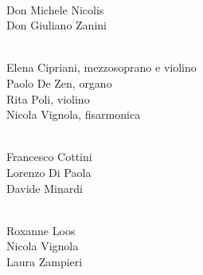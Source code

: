 \documentclass[10pt,b6paper,usenames,twoside]{article}
\newcommand\blankpage{%
    \null
    \thispagestyle{empty}%
    \addtocounter{page}{-1}%
    \newpage}
\begin{document}
\afterpage{\blankpage}


\thispagestyle{empty}%
    \addtocounter{page}{-1}%
    \newpage

\vspace*{10mm}
\begin{center}
\textcolor{forestgreen(traditional)}{\hspace*{-5mm} }\\
\vspace*{3mm}
\normalsize{Don Michele Nicolis\\
Don Giuliano Zanini}

\vspace*{15mm}

\textcolor{forestgreen(traditional)}{\hspace*{-5mm} }\\
\vspace*{3mm}
\normalsize{Elena Cipriani, mezzosoprano e violino\\
Paolo De Zen, organo\\
Rita Poli, violino\\
Nicola Vignola, fisarmonica}
	
\vspace*{15mm}

\vspace*{0mm}
\normalsize{
\begin{minipage}[t]{0.48\textwidth}
\begin{flushleft}
\textcolor{forestgreen(traditional)}{\hspace*{-0mm}}\\
\vspace*{3mm}
Francesco Cottini\\
Lorenzo Di Paola\\
Davide Minardi
\end{flushleft}
\end{minipage}
\hfill
\begin{minipage}[t]{0.48\textwidth}
\begin{flushright}
\textcolor{forestgreen(traditional)}{\hspace*{-5mm}}\\
\vspace*{3mm}
Roxanne Loos\\
Nicola Vignola\\
Laura Zampieri\\
\end{flushright}
\end{minipage}
	}

\end{center}
\end{document}
